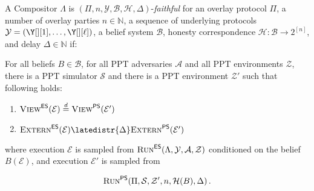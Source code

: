 \begin{definition}
  A Compositor $\Lambda$
  is $(\Pi, n, \mathcal{Y}, \mathcal{B}, \mathcal{H}, \Delta)$-\emph{faithful}
  for an overlay protocol $\Pi$,
  a number of overlay parties $n \in \mathbb{N}$,
  a sequence of underlying protocols $\mathcal{Y} = (\Y[][1], \ldots, \Y[][\ell])$,
  a belief system $\mathcal{B}$,
  honesty correspondence $\mathcal{H}: \mathcal{B} \longrightarrow 2^{[n]}$,
  and delay $\Delta \in \mathbb{N}$ if:

  For all beliefs $B \in \mathcal{B}$,
  for all PPT adversaries $\mathcal{A}$ and all PPT environments $\mathcal{Z}$,
  there is a PPT simulator $\mathcal{S}$ and there is a
  PPT environment $\mathcal{Z}'$ such that following holds:

  \begin{enumerate}
    \item $\LCView(\mathcal{E}) \distreq \PEView(\mathcal{E}')$
    \item $\LCExtern(\mathcal{E}) \latedistr{\Delta} \PEExtern(\mathcal{E}')$
  \end{enumerate}

  where execution $\mathcal{E}$ is sampled from
  $\textsc{Run}^{\textsf{ES}}(\Lambda, \mathcal{Y}, \mathcal{A}, \mathcal{Z})$
  conditioned on the belief $B(\mathcal{E})$,
  and execution $\mathcal{E}'$ is sampled from

  \[
  \textsc{Run}^{\textsf{PS}}(\Pi, \mathcal{S}, \mathcal{Z}', n, \mathcal{H}(B), \Delta)\,.
  \]
\end{definition}


